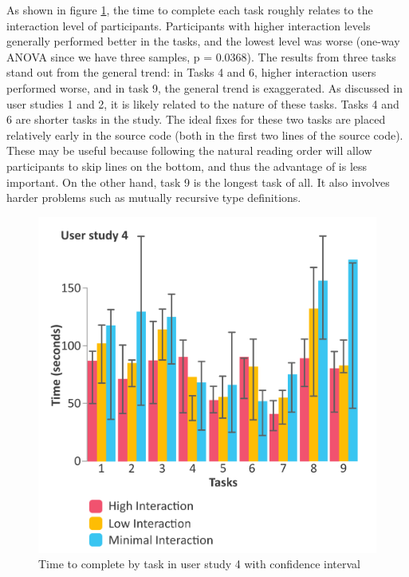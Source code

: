As shown in  figure \ref{fig:r4-analysis}, the time to complete each task roughly relates to the interaction level of participants. Participants with higher interaction levels generally performed better in the tasks, and the lowest level was worse (one-way ANOVA since we have three samples, p = 0.0368). The results from three tasks stand out from the general trend: in Tasks 4 and 6, higher interaction users performed worse, and in task 9, the general trend is exaggerated. As discussed in user studies 1 and 2, it is likely related to the nature of these tasks. Tasks 4 and 6 are shorter tasks in the study. The ideal fixes for these two tasks are placed relatively early in the source code (both in the first two lines of the source code). These may be useful because following the natural reading order will allow participants to skip lines on the bottom, and thus the advantage of \chameleon{} is less important. On the other hand, task 9 is the longest task of all. It also involves harder problems such as mutually recursive type definitions.

\begin{figure}[h]
    \centering
    \includegraphics[width=\linewidth]{images/r4-analysis.pdf}
    \caption{Time to complete by task in user study 4 with confidence interval}
    \label{fig:r4-analysis}
\end{figure}



